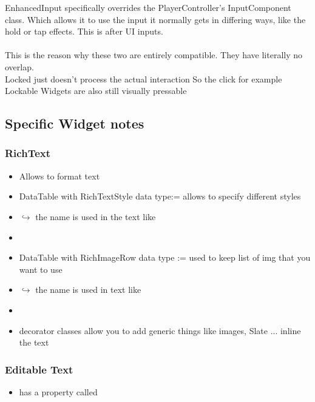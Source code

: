 EnhancedInput specifically overrides the PlayerController's InputComponent class. Which allows it to use the input it normally gets in differing ways, like the hold or tap effects. This is after UI inputs. \\
\\
This is the reason why these two are entirely compatible. They have literally no overlap. \\


Locked just doesn't process the actual interaction
So the click for example
Lockable Widgets are also still visually pressable


    \subsection{Specific Widget notes}
        \subsubsection{RichText}
            \begin{itemize}
                \item Allows to format text
                \item DataTable with RichTextStyle data type:= allows to specify different styles
                \item $\hookrightarrow$ the name is used in the text like 
                \item 
                \item DataTable with RichImageRow data type := used to keep list of img that you want to use
                \item $\hookrightarrow$ the name is used in text like 
                \item 
                \item decorator classes allow you to add generic things like images, Slate ... inline the text
            \end{itemize}


        \subsubsection{Editable Text}
            \begin{itemize}
                \item has a property called \code{}
            \end{itemize}


